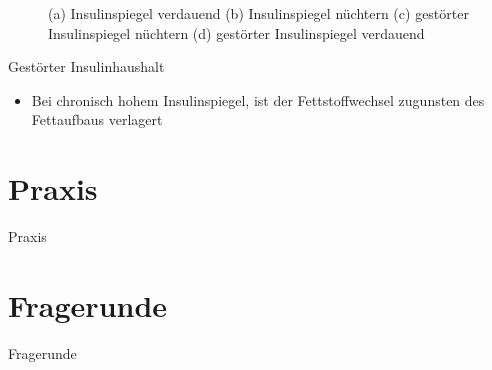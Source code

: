 \documentclass[xcolor=dvipsnames]{beamer}
\begin{document}
\begin{frame}[allowframebreaks]
        \framebreak

        \begin{figure}
            \centering
            \caption{(a) Insulinspiegel verdauend (b) Insulinspiegel nüchtern (c) gestörter Insulinspiegel nüchtern (d) gestörter Insulinspiegel verdauend}
        \end{figure}

        \framebreak

        \begin{block}{Gestörter Insulinhaushalt}
            \begin{itemize}
                \setlength\itemsep{1em}
                \item Bei chronisch hohem Insulinspiegel, ist der Fettstoffwechsel zugunsten des Fettaufbaus verlagert
            \end{itemize}
        \end{block}

    \end{frame}

    \section{Praxis}
    {
        \begin{frame}
            \begin{center}
                \Huge Praxis
            \end{center}
        \end{frame}
    }

    \section{Fragerunde}
    {
        \begin{frame}
            \begin{center}
                \Huge Fragerunde
            \end{center}
        \end{frame}
    }
\end{document}
